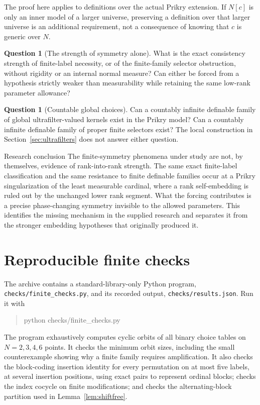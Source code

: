 \documentclass[11pt,letterpaper]{article}
\theoremstyle{definition}
\newtheorem{question}[definition]{Question}
\numberwithin{equation}{section}
\begin{document}
The proof here applies to definitions over the actual Prikry extension. If $N[c]$ is only an inner model of a larger universe, preserving a definition over that larger universe is an additional requirement, not a consequence of knowing that $c$ is generic over $N$.

\begin{question}[The strength of symmetry alone]
What is the exact consistency strength of finite-label necessity, or of the finite-family selector obstruction, without rigidity or an internal normal measure? Can either be forced from a hypothesis strictly weaker than measurability while retaining the same low-rank parameter allowance?
\end{question}

\begin{question}[Countable global choices]
Can a countably infinite definable family of global ultrafilter-valued kernels exist in the Prikry model? Can a countably infinite definable family of proper finite selectors exist? The local construction in Section~\ref{sec:ultrafilters} does not answer either question.
\end{question}

\begin{assessment}{Research conclusion}
The finite-symmetry phenomena under study are not, by themselves, evidence of rank-into-rank strength. The same exact finite-label classification and the same resistance to finite definable families occur at a Prikry singularization of the least measurable cardinal, where a rank self-embedding is ruled out by the unchanged lower rank segment. What the forcing contributes is a precise phase-changing symmetry invisible to the allowed parameters. This identifies the missing mechanism in the supplied research and separates it from the stronger embedding hypotheses that originally produced it.
\end{assessment}

\appendix
\section{Reproducible finite checks}\label{app:checks}

The archive contains a standard-library-only Python program,
\nolinkurl{checks/finite_checks.py}, and its recorded output,
\nolinkurl{checks/results.json}. Run it with
\begin{quote}\ttfamily
python checks/finite\_checks.py
\end{quote}
The program exhaustively computes cyclic orbits of all binary choice tables on $N=2,3,4,6$ points. It checks the minimum orbit sizes, including the small counterexample showing why a finite family requires amplification. It also checks the block-coding insertion identity for every permutation on at most five labels, at several insertion positions, using exact pairs to represent ordinal blocks; checks the index cocycle on finite modifications; and checks the alternating-block partition used in Lemma~\ref{lem:shiftfree}.
\end{document}
